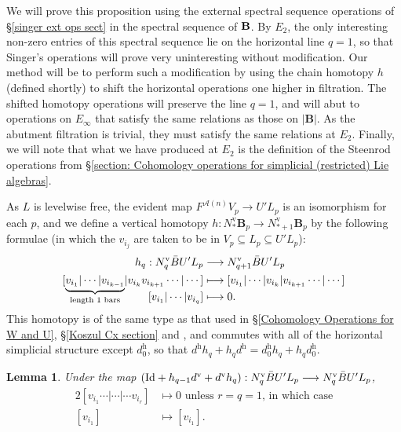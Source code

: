 \documentclass[11pt]{amsart} \renewcommand{\baselinestretch}{1.2}
\theoremstyle{plain}
\newtheorem{lem}[thm]{Lemma}
\numberwithin{equation}{section} %
\theoremstyle{plain}
\newtheorem{lem}[thm]{Lemma}
\numberwithin{equation}{chapter} %
\renewcommand{\to}{\longrightarrow}
\newcommand{\calA}{\mathcal{A}}
\newcommand{\UEA}{U'}%
\newcommand{\uver}{^\mathrm{v}}
\newcommand{\uhor}{^\mathrm{h}}
\newcommand{\diag}[1]{|#1|}
\begin{document}
\begin{appendices}
We will prove this proposition using the external spectral sequence operations of \S\ref{singer ext ops sect} in the spectral sequence of $\textup{\textbf{B}}$. By $E_2$, the only interesting non-zero entries of this spectral sequence lie on the horizontal line $q=1$, so that Singer's operations will prove very uninteresting without modification. Our method will be to perform such a modification by using the  chain homotopy $h$ (defined shortly) to shift the horizontal operations one higher in filtration. The shifted homotopy operations will preserve the line $q=1$, and will abut to operations on $E_\infty$ that satisfy the same relations as those on $\diag{\textbf{B}}$. As the abutment filtration is trivial, they must satisfy the same relations at $E_2$. Finally, we will note that what we have produced at $E_2$ is the definition of the Steenrod operations from \S\ref{section: Cohomology operations for simplicial (restricted) Lie algebras}.


As $ L$ is levelwise free, the evident map $F^{\calA(n)}V_p\to \UEA L_p$ is an isomorphism for each $p$, and we define a vertical homotopy $h:N\uver_*\textbf{B}_{p}\to N\uver_{*+1}\textbf{B}_{p}$ by the following formulae (in which the $v_{i_{j}}$ are taken to be in $V_p\subseteq  L_p\subseteq\UEA L_p$):
\begin{alignat*}{2}
h_q:N\uver_q\bar{B}\UEA L_p&\overset{}{\longrightarrow} N\uver_{q+1}\bar{B}\UEA L_p\\
[\smash{\underbrace{v_{i_1}|\cdots |v_{i_{k-1}}}_{\textup{length 1 bars}}}|v_{i_{k}}v_{i_{k+1}}\cdots |\cdots ]
&\overset{}{\longmapsto}
[v_{i_1}|\cdots |v_{i_{k}}|v_{i_{k+1}}\cdots |\cdots ]%
\\
[v_{i_1}|\cdots |v_{i_{q}}]
&\overset{}{\longmapsto}0.
\end{alignat*}
This homotopy is of the same type as that used in \S\ref{Cohomology Operations for W and U}, \S\ref{Koszul Cx section} and \cite[Proof of Theorem 5.3]{PriddyKoszul.pdf}, and commutes with all of the horizontal simplicial structure except $d\uhor_0$, so that $d\uhor h_q+h_qd\uhor =d\uhor_0h_q+h_qd\uhor_0$.
\begin{lem}
\label{barConstNullHtpyLemma}
Under the map $(\textup{Id}+h_{q-1}d\uver+d\uver h_{q}): N\uver_q\bar{B}\UEA L_p\to N\uver_q\bar{B}\UEA L_p$,
\begin{alignat*}{2}
[v_{i_1}\cdots |\cdots |\cdots v_{i_r}]
&\longmapsto0\text{ unless $r=q=1$, in which case}%
\\
[v_{i_1}]
&\longmapsto [v_{i_{1}}].
\end{alignat*}
\end{lem}


\end{appendices}
\end{document}
